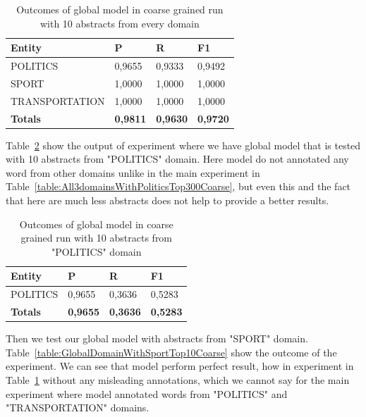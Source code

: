 \documentclass[thesis=M,english]{FITthesis}[2018/05/30]
\begin{document}
	\begin{table}[H]\centering
		\begin{tabular}{|l|l|l|l|}
			\hline {\textbf{Entity}} & {\textbf{P}} & {\textbf{R}} & {\textbf{F1}}\\\hline
				POLITICS & 0,9655 & 0,9333 & 0,9492\\
				SPORT & 1,0000 & 1,0000 & 1,0000\\
				TRANSPORTATION & 1,0000 & 1,0000 & 1,0000\\\hline
				\textbf{Totals} & \textbf{0,9811} & \textbf{0,9630} & \textbf{0,9720}\\\hline
		\end{tabular}
	\caption{Outcomes of global model in coarse grained run with 10 abstracts from every domain \label{table:GlobalDomainWithAllAbstractsTop10Coarse}}
	\end{table}

	Table~\ref{table:GlobalDomainWithPoliticsTop10Coarse} show the output of experiment where we have global model that is tested with 10 abstracts from "POLITICS" domain. Here model do not annotated any word from other domains unlike in the main experiment in Table~\ref{table:All3domainsWithPoliticsTop300Coarse}, but even this and the fact that here are much less abstracts does not help to provide a better results.
	
	\begin{table}[H]\centering
		\begin{tabular}{|l|l|l|l|}
			\hline {\textbf{Entity}} & {\textbf{P}} & {\textbf{R}} & {\textbf{F1}}\\\hline
				POLITICS & 0,9655 & 0,3636 & 0,5283\\\hline
				\textbf{Totals} & \textbf{0,9655} & \textbf{0,3636} & \textbf{0,5283}\\\hline
		\end{tabular}
		\caption{Outcomes of global model in coarse grained run with 10 abstracts from "POLITICS" domain \label{table:GlobalDomainWithPoliticsTop10Coarse}}
	\end{table}

	Then we test our global model with abstracts from "SPORT" domain. Table~\ref{table:GlobalDomainWithSportTop10Coarse} show the outcome of the experiment. We can see that model perform perfect result, how in experiment in Table~\ref{table:GlobalDomainWithAllAbstractsTop10Coarse} without any misleading annotations, which we cannot say for the main experiment where model annotated words from "POLITICS" and "TRANSPORTATION" domains. 
	
\end{document}
